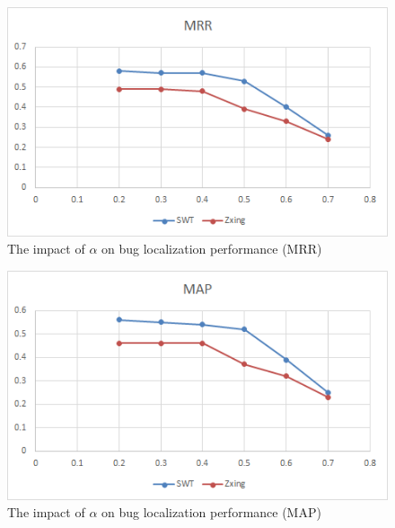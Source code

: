 \documentclass[conference]{IEEEtran}
\begin{document}

\begin{figure}
	\centering
	\includegraphics[scale=0.80]{MRR-SWT-Zxing}
	\caption{The impact of $\alpha$ on bug localization performance (MRR)}
	\label{fig:MRR}
\end{figure}

\begin{figure}
	\centering
	\includegraphics[scale=0.80]{MAP-SWT-Zxing}
	\caption{The impact of $\alpha$ on bug localization performance (MAP)}
	\label{fig:MAP}
\end{figure}
\end{document}
